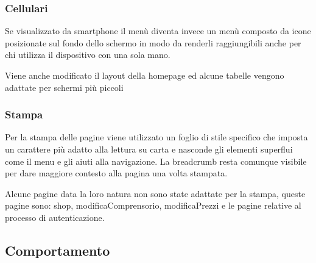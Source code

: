 \subsubsection{Cellulari}
Se visualizzato da smartphone il menù diventa invece un menù composto da icone posizionate sul fondo dello schermo in modo da renderli raggiungibili anche per chi utilizza il dispositivo con una sola mano.

Viene anche modificato il layout della homepage ed alcune tabelle vengono adattate per schermi più piccoli

\subsubsection{Stampa}
Per la stampa delle pagine viene utilizzato un foglio di stile specifico che imposta un carattere più adatto alla lettura su carta e nasconde gli elementi superflui come il menu e gli aiuti alla navigazione.
La breadcrumb resta comunque visibile per dare maggiore contesto alla pagina una volta stampata.

Alcune pagine data la loro natura non sono state adattate per la stampa, queste pagine sono: shop, modificaComprensorio, modificaPrezzi e le pagine relative al processo di autenticazione.

\subsection{Comportamento}